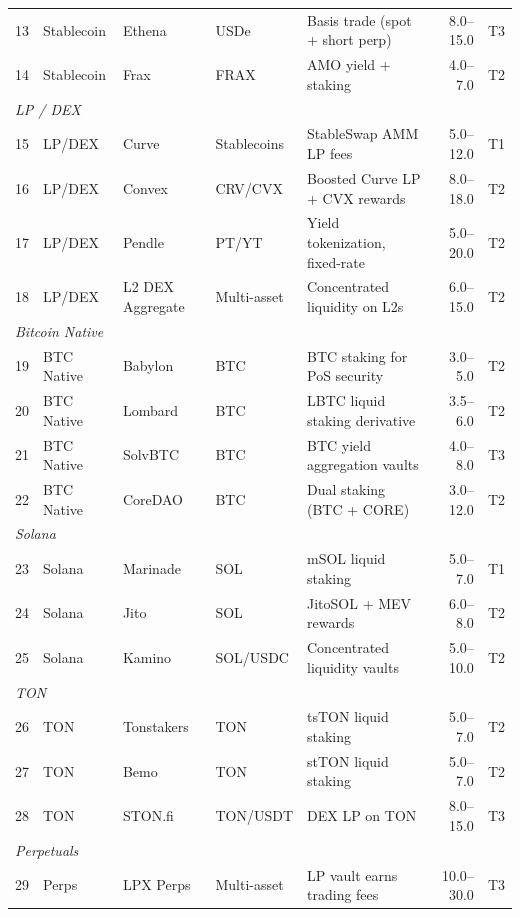 \documentclass[11pt,twocolumn]{article}
\begin{document}
\begin{table}[t]
\begin{tabular}{@{}rllllrr@{}}
13 & Stablecoin & Ethena & USDe & Basis trade (spot + short perp) & 8.0--15.0 & T3 \\
14 & Stablecoin & Frax & FRAX & AMO yield + staking & 4.0--7.0 & T2 \\
\midrule
\multicolumn{7}{l}{\textit{LP / DEX}} \\
15 & LP/DEX & Curve & Stablecoins & StableSwap AMM LP fees & 5.0--12.0 & T1 \\
16 & LP/DEX & Convex & CRV/CVX & Boosted Curve LP + CVX rewards & 8.0--18.0 & T2 \\
17 & LP/DEX & Pendle & PT/YT & Yield tokenization, fixed-rate & 5.0--20.0 & T2 \\
18 & LP/DEX & L2 DEX Aggregate & Multi-asset & Concentrated liquidity on L2s & 6.0--15.0 & T2 \\
\midrule
\multicolumn{7}{l}{\textit{Bitcoin Native}} \\
19 & BTC Native & Babylon & BTC & BTC staking for PoS security & 3.0--5.0 & T2 \\
20 & BTC Native & Lombard & BTC & LBTC liquid staking derivative & 3.5--6.0 & T2 \\
21 & BTC Native & SolvBTC & BTC & BTC yield aggregation vaults & 4.0--8.0 & T3 \\
22 & BTC Native & CoreDAO & BTC & Dual staking (BTC + CORE) & 3.0--12.0 & T2 \\
\midrule
\multicolumn{7}{l}{\textit{Solana}} \\
23 & Solana & Marinade & SOL & mSOL liquid staking & 5.0--7.0 & T1 \\
24 & Solana & Jito & SOL & JitoSOL + MEV rewards & 6.0--8.0 & T2 \\
25 & Solana & Kamino & SOL/USDC & Concentrated liquidity vaults & 5.0--10.0 & T2 \\
\midrule
\multicolumn{7}{l}{\textit{TON}} \\
26 & TON & Tonstakers & TON & tsTON liquid staking & 5.0--7.0 & T2 \\
27 & TON & Bemo & TON & stTON liquid staking & 5.0--7.0 & T2 \\
28 & TON & STON.fi & TON/USDT & DEX LP on TON & 8.0--15.0 & T3 \\
\midrule
\multicolumn{7}{l}{\textit{Perpetuals}} \\
29 & Perps & LPX Perps & Multi-asset & LP vault earns trading fees & 10.0--30.0 & T3 \\
\bottomrule
\end{tabular}
\end{table}
\end{document}
